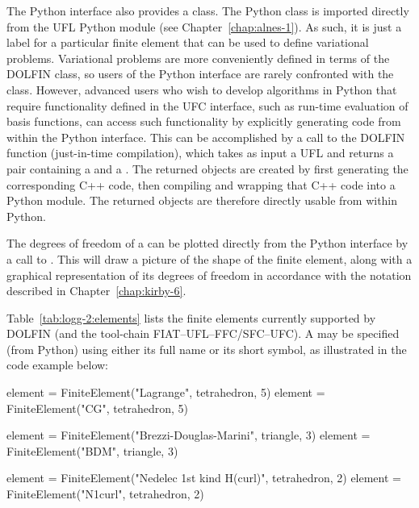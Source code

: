 The Python interface also provides a  class.
The Python  class is
imported directly from the UFL Python module (see
Chapter~\ref{chap:alnes-1}). As such, it is just a label for a
particular finite element that can be used to define variational
problems. Variational problems are more conveniently defined in
terms of the DOLFIN  class,
so users of the Python interface are rarely confronted with
the  class. However, advanced users who wish to
develop algorithms in Python that require functionality defined in the
UFC interface, such as run-time evaluation of basis functions, can
access such functionality by explicitly generating code from within
the Python interface. This can be accomplished by a call to the
DOLFIN  function (just-in-time compilation), which takes as
input a UFL  and returns a pair containing a
 and a . The returned
objects are created by first generating the corresponding C++ code,
then compiling and wrapping that C++ code into a Python module. The
returned objects are therefore directly usable from within Python.

The degrees of freedom of a  can be plotted directly
from the Python interface by a call to . This will
draw a picture of the shape of the finite element, along with a graphical
representation of its degrees of freedom in accordance with the notation
described in Chapter~\ref{chap:kirby-6}.

Table~\ref{tab:logg-2:elements} lists the finite elements currently
supported by DOLFIN (and the tool-chain FIAT--UFL--FFC/SFC--UFC). A
 may be specified (from Python) using either its full
name or its short symbol, as illustrated in the code example below:
\begin{uflcode}
element = FiniteElement("Lagrange", tetrahedron, 5)
element = FiniteElement("CG", tetrahedron, 5)

element = FiniteElement("Brezzi-Douglas-Marini", triangle, 3)
element = FiniteElement("BDM", triangle, 3)

element = FiniteElement("Nedelec 1st kind H(curl)", tetrahedron, 2)
element = FiniteElement("N1curl", tetrahedron, 2)
\end{uflcode}

